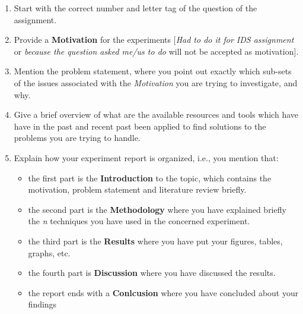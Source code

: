 \begin{enumerate}
 \item Start with the correct number and letter tag of the question of the assignment.
 \item Provide a \textbf{Motivation} for the experiments [\textit{Had to do it for IDS assignment} or \textit{because the question asked me/us to do} will not be accepted as motivation]. 
 \item Mention the problem statement, where you point out exactly which sub-sets of the issues associated with the \textit{Motivation} you are trying to investigate, and why.
 \item Give a brief overview of what are the available resources and tools which have have in the past and recent past been applied to find solutions to the problems you are trying to handle. 
 \item Explain how your experiment report is organized, i.e., you mention that:
 \begin{itemize}
  \item the first part is the \textbf{Introduction} to the topic, which contains the motivation, problem statement and literature review briefly.
  \item the second part is the \textbf{Methodology} where you have explained briefly the \textit{n} techniques you have used in the concerned experiment.
  \item the third part is the \textbf{Results} where you have put your figures, tables, graphs, etc. 
  \item the fourth part is \textbf{Discussion} where you have discussed the results.
  \item the report ends with a \textbf{Conlcusion} where you have concluded about your findings 
 \end{itemize}

\end{enumerate}